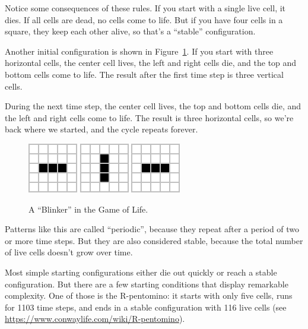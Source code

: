 
Notice some consequences of these rules.
If you start with a single live cell, it dies.
If all cells are dead, no cells come to life.
But if you have four cells in a square, they keep each other alive, so that's a ``stable'' configuration.

Another initial configuration is shown in Figure~\ref{fig:blinker}.
If you start with three horizontal cells, the center cell lives, the left and right cells die, and the top and bottom cells come to life.
The result after the first time step is three vertical cells.

During the next time step, the center cell lives, the top and bottom cells die, and the left and right cells come to life.
The result is three horizontal cells, so we're back where we started, and the cycle repeats forever.

\begin{figure}[!ht]
\begin{center}
\includegraphics{figs/blinker-0.png}
\raisebox{38pt}{~$\longrightarrow$~}
\includegraphics{figs/blinker-1.png}
\raisebox{38pt}{~$\longrightarrow$~}
\includegraphics{figs/blinker-0.png}
\raisebox{38pt}{~$\longrightarrow$~ \ldots}
\caption{A ``Blinker'' in the Game of Life.}
\label{fig:blinker}
\end{center}
\end{figure}

Patterns like this are called ``periodic'', because they repeat after a period of two or more time steps.
But they are also considered stable, because the total number of live cells doesn't grow over time.

Most simple starting configurations either die out quickly or reach a stable configuration.
But there are a few starting conditions that display remarkable complexity.
One of those is the R-pentomino: it starts with only five cells, runs for 1103 time steps, and ends in a stable configuration with 116 live cells (see \url{https://www.conwaylife.com/wiki/R-pentomino}).

